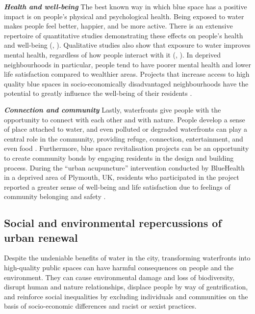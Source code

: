 \documentclass{article}
\newcommand{\bisection}[1]{\textbf{\textit{#1}}}
\begin{document}
\bisection{Health and well-being}
The best known way in which blue space has a positive impact is on people's physical and psychological health. Being exposed to water makes people feel better, happier, and be more active. 
There is an extensive repertoire of quantitative studies demonstrating these effects on people's health and well-being (\cite{gascon2017outdoor}, \cite{britton2020blue}).
Qualitative studies also show that exposure to water improves mental health, regardless of how people interact with it (\cite{garrett2019urban}, \cite{van2021urban}).
In deprived neighbourhoods in particular, people tend to have poorer mental health and lower life satisfaction compared to wealthier areas. Projects that increase access to high quality blue spaces in socio-economically disadvantaged neighbourhoods have the potential to greatly influence the well-being of their residents \parencite{van2021urban}.

\bisection{Connection and community}
Lastly, waterfronts give people with the opportunity to connect with each other and with nature. People develop a sense of place attached to water, and even polluted or degraded waterfronts can play a central role in the community, providing refuge, connection, entertainment, and even food \parencite{toomey2021place}. 
Furthermore, blue space revitalisation projects can be an opportunity to create community bonds by engaging residents in the design and building process. During the ``urban acupuncture'' intervention conducted by BlueHealth in a deprived area of Plymouth, UK, residents who participated in the project reported a greater sense of well-being and life satisfaction due to feelings of community belonging and safety \parencite{van2021urban}.



\subsection{Social and environmental repercussions of urban renewal}

Despite the undeniable benefits of water in the city, transforming waterfronts into high-quality public spaces can have harmful consequences on people and the environment. They can cause environmental damage and loss of biodiversity, disrupt human and nature relationships, displace people by way of gentrification, and reinforce social inequalities by excluding individuals and communities on the basis of socio-economic differences and racist or sexist practices.
\end{document}
